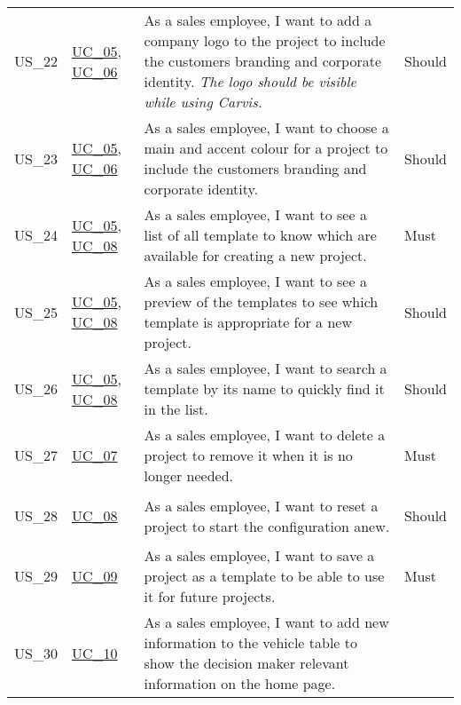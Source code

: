 \begin{footnotesize}
\begin{longtable}[L L L L]{ p{} p{} p{} p{} }
      \hypertarget{Ref:US22}{US\_22} & \hyperlink{Ref:UC5}{UC\_05}, \newline \hyperlink{Ref:UC6}{UC\_06} & As a sales employee, I want to add a company logo to the project to include the customers branding and corporate identity. 
      \newline\newline
      \emph{The logo should be visible while using Carvis.} & Should
      \\
      \hypertarget{Ref:US23}{US\_23} & \hyperlink{Ref:UC5}{UC\_05}, \newline \hyperlink{Ref:UC6}{UC\_06} & As a sales employee, I want to choose a main and accent colour for a project to include the customers branding and corporate identity. & Should \\
      \hypertarget{Ref:US24}{US\_24} & \hyperlink{Ref:UC5}{UC\_05}, \newline \hyperlink{Ref:UC8}{UC\_08} & As a sales employee, I want to see a list of all template to know which are available for creating a new project. & Must \\
      \hypertarget{Ref:US25}{US\_25} & \hyperlink{Ref:UC5}{UC\_05}, \newline \hyperlink{Ref:UC8}{UC\_08} & As a sales employee, I want to see a preview of the templates to see which template is appropriate for a new project. & Should \\
      \hypertarget{Ref:US26}{US\_26} & \hyperlink{Ref:UC5}{UC\_05}, \newline \hyperlink{Ref:UC8}{UC\_08} & As a sales employee, I want to search a template by its name to quickly find it in the list. & Should \\
      \hypertarget{Ref:US27}{US\_27} & \hyperlink{Ref:UC7}{UC\_07} & As a sales employee, I want to delete a project to remove it when it is no longer needed. & Must \\
      \hypertarget{Ref:US28}{US\_28} & \hyperlink{Ref:UC8}{UC\_08} & As a sales employee, I want to reset a project to start the configuration anew. & Should \\
      \hypertarget{Ref:US29}{US\_29} & \hyperlink{Ref:UC9}{UC\_09} & As a sales employee, I want to save a project as a template to be able to use it for future projects. & Must \\
      \hypertarget{Ref:US30}{US\_30} & \hyperlink{Ref:UC10}{UC\_10} & As a sales employee, I want to add new information to the vehicle table to show the decision maker relevant information on the home page.
      \newline\newline

\end{longtable}
\end{footnotesize}
